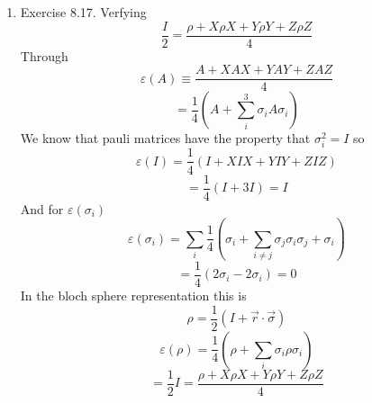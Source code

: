 \documentclass[12pt]{article}
\begin{document}
\begin{enumerate}
    \item Exercise 8.17. Verfying 
    $$ \frac{I}{2} = \frac{\rho + X \rho X + Y \rho Y + Z \rho Z}{4} $$
    Through 
    $$ \varepsilon (A) \equiv \frac{A + X A X + Y A Y + Z A Z}{4} $$
    $$ = \frac{1}{4} ( A + \sum_i^3 \sigma_i A \sigma_i) $$
    We know that pauli matrices have the property that $\sigma_i^2 = I$ so 
    $$ \varepsilon (I) = \frac{1}{4} ( I + XIX + YIY + ZIZ) $$
    $$ = \frac{1}{4} (I+ 3I) = I $$
    And for $\varepsilon(\sigma_i) $ 
    $$ \varepsilon (\sigma_i) = \sum_i \frac{1}{4} ( \sigma_i + \sum_{i \neq j} \sigma_j \sigma_i \sigma_j + \sigma_i) $$
    $$ = \frac{1}{4} ( 2 \sigma_i - 2 \sigma_i) = 0 $$
    In the bloch sphere representation this is 
    $$ \rho = \frac{1}{2} ( I + \vec{r} \cdot \vec{\sigma}) $$ 
    $$ \varepsilon (\rho) = \frac{1}{4} ( \rho + \sum_i \sigma_i \rho \sigma_i) $$
    $$ = \frac{1}{2} I = \frac{\rho + X \rho X + Y \rho Y + Z \rho Z}{4} $$


\end{enumerate}
\end{document}
